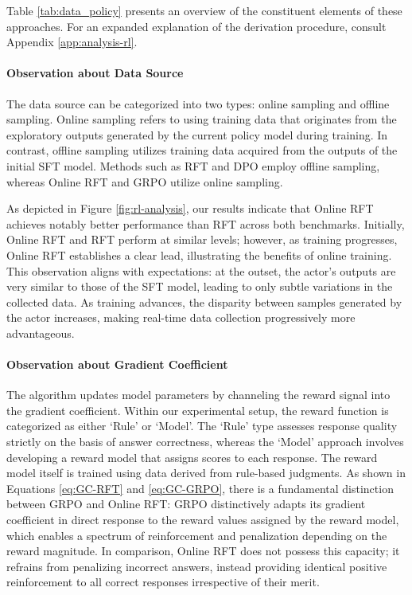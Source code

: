 \begin{itemize}[topsep=0pt]
\begin{itemize}[topsep=0pt]
Table \ref{tab:data_policy} presents an overview of the constituent elements of these approaches. For an expanded explanation of the derivation procedure, consult Appendix \ref{app:analysis-rl}.

\paragraph{Observation about Data Source} The data source can be categorized into two types: online sampling and offline sampling. Online sampling refers to using training data that originates from the exploratory outputs generated by the current policy model during training. In contrast, offline sampling utilizes training data acquired from the outputs of the initial SFT model. Methods such as RFT and DPO employ offline sampling, whereas Online RFT and GRPO utilize online sampling.

As depicted in Figure \ref{fig:rl-analysis}, our results indicate that Online RFT achieves notably better performance than RFT across both benchmarks. Initially, Online RFT and RFT perform at similar levels; however, as training progresses, Online RFT establishes a clear lead, illustrating the benefits of online training. This observation aligns with expectations: at the outset, the actor's outputs are very similar to those of the SFT model, leading to only subtle variations in the collected data. As training advances, the disparity between samples generated by the actor increases, making real-time data collection progressively more advantageous.

\paragraph{Observation about Gradient Coefficient} The algorithm updates model parameters by channeling the reward signal into the gradient coefficient. Within our experimental setup, the reward function is categorized as either `Rule' or `Model'. The `Rule' type assesses response quality strictly on the basis of answer correctness, whereas the `Model' approach involves developing a reward model that assigns scores to each response. The reward model itself is trained using data derived from rule-based judgments. As shown in Equations \ref{eq:GC-RFT} and \ref{eq:GC-GRPO}, there is a fundamental distinction between GRPO and Online RFT: GRPO distinctively adapts its gradient coefficient in direct response to the reward values assigned by the reward model, which enables a spectrum of reinforcement and penalization depending on the reward magnitude. In comparison, Online RFT does not possess this capacity; it refrains from penalizing incorrect answers, instead providing identical positive reinforcement to all correct responses irrespective of their merit.


\end{itemize}
\end{itemize}
